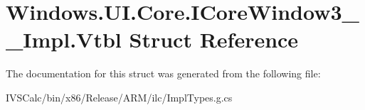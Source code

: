 \hypertarget{struct_windows_1_1_u_i_1_1_core_1_1_i_core_window3_____impl_1_1_vtbl}{}\section{Windows.\+U\+I.\+Core.\+I\+Core\+Window3\+\_\+\+\_\+\+Impl.\+Vtbl Struct Reference}
\label{struct_windows_1_1_u_i_1_1_core_1_1_i_core_window3_____impl_1_1_vtbl}


The documentation for this struct was generated from the following file\+:\begin{DoxyCompactItemize}
\item 
I\+V\+S\+Calc/bin/x86/\+Release/\+A\+R\+M/ilc/Impl\+Types.\+g.\+cs\end{DoxyCompactItemize}

